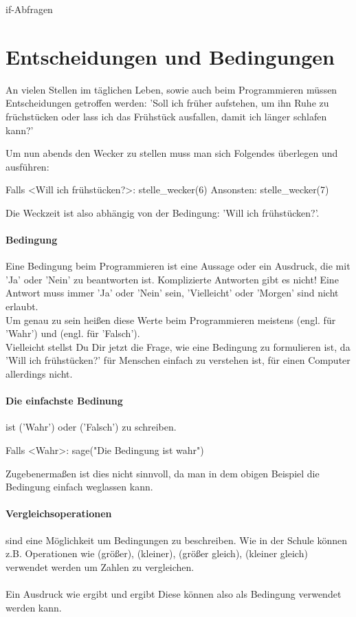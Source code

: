 \documentclass{\VorlagenPfad/coderdojokatext}
\newcommand{\Titel}{if-Abfragen}
\begin{document}
\begin{center}
	{\huge \Titel}
\end{center}

\section{Entscheidungen und Bedingungen}
An vielen Stellen im täglichen Leben, sowie auch beim Programmieren müssen Entscheidungen getroffen werden:
'Soll ich früher aufstehen, um ihn Ruhe zu früchstücken oder lass ich das Frühstück ausfallen, damit ich länger schlafen kann?'
	
Um nun abends den Wecker zu stellen muss man sich Folgendes überlegen und ausführen:

\begin{pseudocode}
Falls <Will ich frühstücken?>:
	stelle_wecker(6)
Ansonsten:
	stelle_wecker(7)
\end{pseudocode}

Die Weckzeit ist also abhängig von der Bedingung: 'Will ich frühstücken?'.

\paragraph{Bedingung} Eine Bedingung beim Programmieren ist eine Aussage oder ein Ausdruck,
die mit 'Ja' oder 'Nein' zu beantworten ist. Komplizierte Antworten gibt es nicht! Eine Antwort
muss immer 'Ja' oder 'Nein' sein, 'Vielleicht' oder 'Morgen' sind nicht erlaubt.
\\
Um genau zu sein heißen diese Werte beim Programmieren meistens  (engl. für 'Wahr') und  (engl. für 'Falsch').
\\
Vielleicht stellst Du Dir jetzt die Frage, wie eine Bedingung zu formulieren ist, da 'Will ich frühstücken?' für Menschen einfach zu verstehen ist, für einen Computer allerdings nicht.

\paragraph{Die einfachste Bedinung} ist ('Wahr') oder  ('Falsch') zu schreiben.
\begin{pseudocode}
Falls <Wahr>:
	sage("Die Bedingung ist wahr")
\end{pseudocode}
Zugebenermaßen ist dies nicht sinnvoll, da man in dem obigen Beispiel die Bedingung einfach weglassen kann.
	
\paragraph{Vergleichsoperationen} sind eine Möglichkeit um Bedingungen zu beschreiben. Wie in der Schule können z.B. Operationen wie \code{>} (größer), \code{<} (kleiner),\code{>=} (größer gleich), \code{<=} (kleiner gleich) verwendet werden um Zahlen zu vergleichen.
\\
\\
Ein Ausdruck wie  ergibt  und  ergibt  Diese können also als Bedingung verwendet werden kann.
\end{document}
